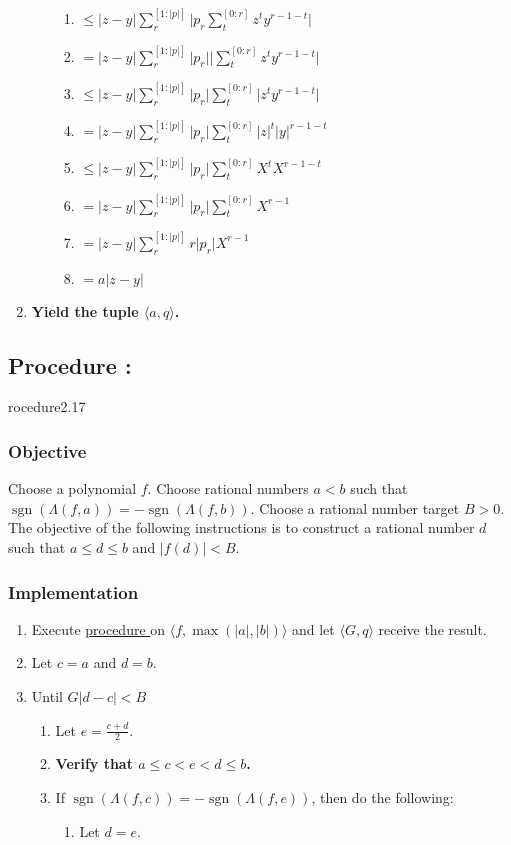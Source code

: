 \documentclass{article}
\DeclareMathOperator{\sgn}{sgn}
\newcounter{procedure}[part]
\newcommand{\procedure}[1]{\subsection*{Procedure \thepart:\theprocedure}\label{sec:procedure #1}\global\expandafter\edef\csname procedure#1\endcsname{\thepart:\theprocedure}\addtocounter{procedure}{1}}
\newcommand{\objective}{\subsubsection*{Objective}}
\newcommand{\implementation}{\subsubsection*{Implementation}}
\newcommand{\procedurehr}[1]{\hyperref[sec:procedure #1]{procedure \expandafter\csname procedure#1\endcsname}}
\begin{document}
\begin{multicols}{2}
\begin{enumerate}
\begin{enumerate}
\begin{enumerate}
							\item $\le\lvert z-y\rvert\sum_{r}^{[1:\lvert p\rvert]}\lvert p_r\sum_t^{[0:r]}z^ty^{r-1-t}\rvert$
							\item $=\lvert z-y\rvert\sum_{r}^{[1:\lvert p\rvert]}\lvert p_r\rvert\lvert\sum_t^{[0:r]}z^ty^{r-1-t}\rvert$
							\item $\le\lvert z-y\rvert\sum_{r}^{[1:\lvert p\rvert]}\lvert p_r\rvert\sum_t^{[0:r]}\lvert z^ty^{r-1-t}\rvert$
							\item $=\lvert z-y\rvert\sum_{r}^{[1:\lvert p\rvert]}\lvert p_r\rvert\sum_t^{[0:r]}\lvert z\rvert^t\lvert y\rvert^{r-1-t}$
							\item $\le\lvert z-y\rvert\sum_{r}^{[1:\lvert p\rvert]}\lvert p_r\rvert\sum_t^{[0:r]}X^tX^{r-1-t}$
							\item $=\lvert z-y\rvert\sum_{r}^{[1:\lvert p\rvert]}\lvert p_r\rvert\sum_t^{[0:r]}X^{r-1}$
							\item $=\lvert z-y\rvert\sum_{r}^{[1:\lvert p\rvert]}r\lvert p_r\rvert X^{r-1}$
							\item $=a\lvert z-y\rvert$
						\end{enumerate}
					\end{enumerate}
					\item \textbf{Yield the tuple $\langle a,q\rangle$.}
				\end{enumerate}
		\procedure{2.17}
			\objective
				Choose a polynomial $f$. Choose rational numbers $a<b$ such that $\sgn(\Lambda(f,a))=-\sgn(\Lambda(f,b))$. Choose a rational number target $B>0$. The objective of the following instructions is to construct a rational number $d$ such that $a\le d\le b$ and $\lvert f(d)\rvert<B$.
			\implementation
				\begin{enumerate}
					\item Execute \procedurehr{2.15} on $\langle f,\max(\lvert a\rvert,\lvert b\rvert)\rangle$ and let $\langle G,q\rangle$ receive the result.
					\item Let $c=a$ and $d=b$.
					\item Until $G\lvert d-c\rvert<B$
					\begin{enumerate}
						\item Let $e=\frac{c+d}{2}$.
						\item \textbf{Verify that $a\le c<e<d\le b$.}
						\item If $\sgn(\Lambda(f,c))=-\sgn(\Lambda(f,e))$, then do the following:
						\begin{enumerate}
							\item Let $d=e$.

\end{enumerate}
\end{enumerate}
\end{enumerate}
\end{multicols}
\end{document}
